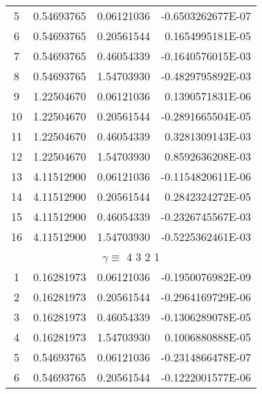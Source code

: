 \begin{longtable}{@{\extracolsep{\fill}}cllr@{}}
5  &  0.54693765  &  0.06121036  &  -0.6503262677E-07 \\

6  &  0.54693765  &  0.20561544  &   0.1654995181E-05 \\

7  &  0.54693765  &  0.46054339  &  -0.1640576015E-03 \\

8  &  0.54693765  &  1.54703930  &  -0.4829795892E-03 \\

9  &  1.22504670  &  0.06121036  &   0.1390571831E-06 \\

10  &  1.22504670  &  0.20561544  &  -0.2891665504E-05 \\

11  &  1.22504670  &  0.46054339  &   0.3281309143E-03 \\

12  &  1.22504670  &  1.54703930  &   0.8592636208E-03 \\

13  &  4.11512900  &  0.06121036  &  -0.1154820611E-06 \\

14  &  4.11512900  &  0.20561544  &   0.2842324272E-05 \\

15  &  4.11512900  &  0.46054339  &  -0.2326745567E-03 \\

16  &  4.11512900  &  1.54703930  &  -0.5225362461E-03 \\

\midrule

\multicolumn{4}{c}{ $\gamma \equiv $  4 3 2 1} \\

\midrule

1  &  0.16281973  &  0.06121036  &  -0.1950076982E-09 \\

2  &  0.16281973  &  0.20561544  &  -0.2964169729E-06 \\

3  &  0.16281973  &  0.46054339  &  -0.1306289078E-05 \\

4  &  0.16281973  &  1.54703930  &   0.1006880888E-05 \\

5  &  0.54693765  &  0.06121036  &  -0.2314866478E-07 \\

6  &  0.54693765  &  0.20561544  &  -0.1222001577E-06 \\


\end{longtable}

